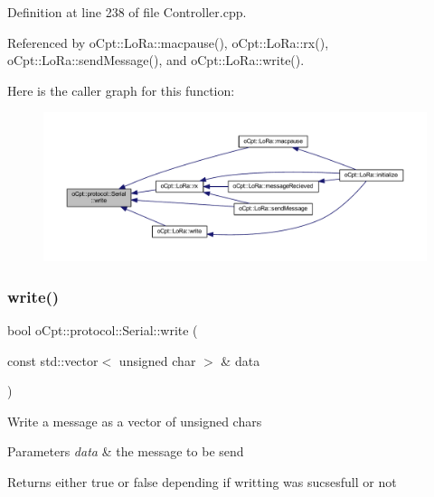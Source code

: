 Definition at line 238 of file Controller.\+cpp.



Referenced by o\+Cpt\+::\+Lo\+Ra\+::macpause(), o\+Cpt\+::\+Lo\+Ra\+::rx(), o\+Cpt\+::\+Lo\+Ra\+::send\+Message(), and o\+Cpt\+::\+Lo\+Ra\+::write().

Here is the caller graph for this function\+:\nopagebreak
\begin{figure}[H]
\begin{center}
\leavevmode
\includegraphics[width=350pt]{classo_cpt_1_1protocol_1_1_serial_aa8e04c844af565e2532e771002a5a654_icgraph}
\end{center}
\end{figure}
\hypertarget{classo_cpt_1_1protocol_1_1_serial_ae99cac9dc20997ca09742df8d1bc6091}{}\label{classo_cpt_1_1protocol_1_1_serial_ae99cac9dc20997ca09742df8d1bc6091} 
\subsubsection{\texorpdfstring{write()}{write()}\hspace{0.1cm}{\footnotesize\ttfamily [2/2]}}
{\footnotesize\ttfamily bool o\+Cpt\+::protocol\+::\+Serial\+::write (\begin{DoxyParamCaption}\item[{const std\+::vector$<$ unsigned char $>$ \&}]{data }\end{DoxyParamCaption})}

Write a message as a vector of unsigned chars 
\begin{DoxyParams}{Parameters}
{\em data} & the message to be send \\
\hline
\end{DoxyParams}
\begin{DoxyReturn}{Returns}
either true or false depending if writting was sucsesfull or not 
\end{DoxyReturn}


